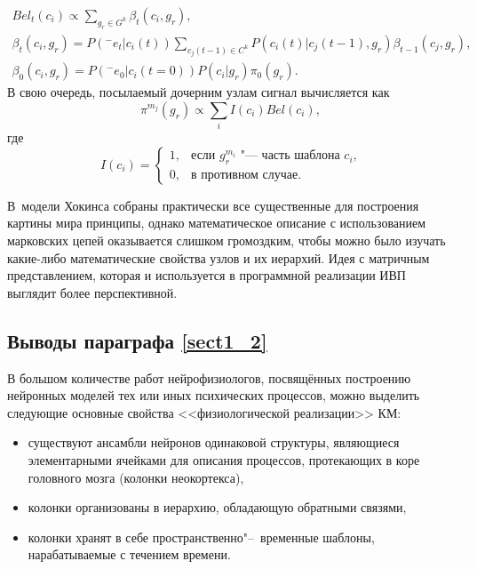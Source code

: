 \begin{equation}
	\begin{split}
		Bel_t(c_i)\varpropto\sum_{g_r\in G^k}\beta_t(c_i,g_r),\\
		\beta_t(c_i,g_r)=P({}^-e_t|c_i(t))\sum_{c_j(t-1)\in C^k}P(c_i(t)|c_j(t-1),g_r)\beta_{t-1}(c_j,g_r),\\
		\beta_0(c_i,g_r)=P({}^-e_0|c_i(t=0))P(c_i|g_r)\pi_0(g_r).
	\end{split}
\end{equation}
В свою очередь, посылаемый дочерним узлам сигнал вычисляется как
\begin{equation}
	\pi^{m_j}(g_r)\varpropto\sum_i I(c_i)Bel(c_i),
\end{equation}
где
\begin{equation}
	I(c_i)=
	\begin{cases}
		1, & \text{если $g_r^{m_i}$ "--- часть шаблона $c_i$,}\\
		0, & \text{в противном случае.}
	\end{cases}
\end{equation}

В~модели Хокинса собраны практически все существенные для построения картины мира принципы, однако математическое описание с использованием марковских цепей оказывается слишком громоздким, чтобы можно было изучать какие-либо математические свойства узлов и их иерархий. Идея с матричным представлением, которая и используется в программной реализации ИВП выглядит более перспективной.

\subsection{Выводы параграфа \ref{sect1_2}}

В большом количестве работ нейрофизиологов, посвящённых построению нейронных моделей тех или иных психических процессов, можно выделить следующие основные свойства <<физиологической реализации>> КМ:
\begin{itemize}
	\item существуют ансамбли нейронов одинаковой структуры, являющиеся элементарными ячейками для описания процессов, протекающих в коре головного мозга (колонки неокортекса),
	\item колонки организованы в иерархию, обладающую обратными связями,
	\item колонки хранят в себе пространственно"--~временные шаблоны, нарабатываемые с течением времени.
\end{itemize}

